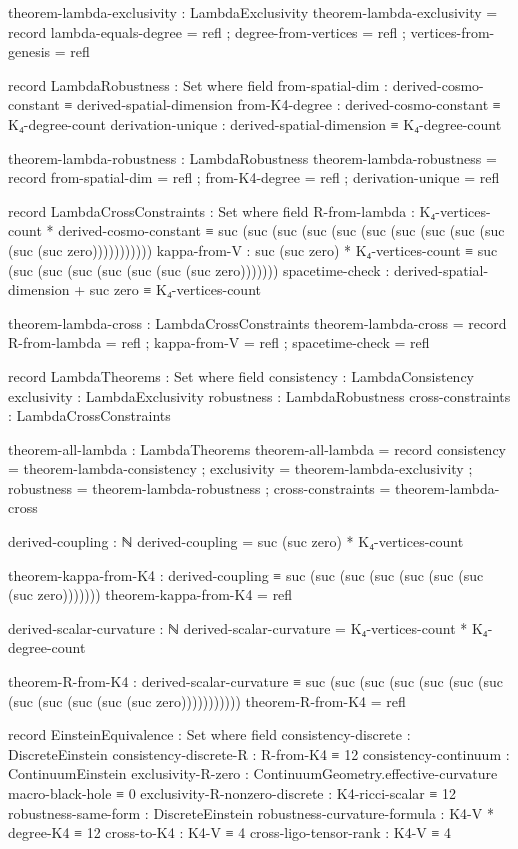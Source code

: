 \documentclass[11pt,a4paper]{book}
\begin{document}
\begin{code}
theorem-lambda-exclusivity : LambdaExclusivity
theorem-lambda-exclusivity = record
  { lambda-equals-degree = refl
  ; degree-from-vertices = refl
  ; vertices-from-genesis = refl
  }

record LambdaRobustness : Set where
  field
    from-spatial-dim   : derived-cosmo-constant ≡ derived-spatial-dimension
    from-K4-degree     : derived-cosmo-constant ≡ K₄-degree-count
    derivation-unique  : derived-spatial-dimension ≡ K₄-degree-count

theorem-lambda-robustness : LambdaRobustness
theorem-lambda-robustness = record
  { from-spatial-dim  = refl
  ; from-K4-degree    = refl
  ; derivation-unique = refl
  }

record LambdaCrossConstraints : Set where
  field
    R-from-lambda      : K₄-vertices-count * derived-cosmo-constant ≡ suc (suc (suc (suc (suc (suc (suc (suc (suc (suc (suc (suc zero)))))))))))
    kappa-from-V       : suc (suc zero) * K₄-vertices-count ≡ suc (suc (suc (suc (suc (suc (suc (suc zero)))))))
    spacetime-check    : derived-spatial-dimension + suc zero ≡ K₄-vertices-count

theorem-lambda-cross : LambdaCrossConstraints
theorem-lambda-cross = record
  { R-from-lambda      = refl
  ; kappa-from-V       = refl
  ; spacetime-check    = refl
  }

record LambdaTheorems : Set where
  field
    consistency       : LambdaConsistency
    exclusivity       : LambdaExclusivity
    robustness        : LambdaRobustness
    cross-constraints : LambdaCrossConstraints

theorem-all-lambda : LambdaTheorems
theorem-all-lambda = record
  { consistency       = theorem-lambda-consistency
  ; exclusivity       = theorem-lambda-exclusivity
  ; robustness        = theorem-lambda-robustness
  ; cross-constraints = theorem-lambda-cross
  }

derived-coupling : ℕ
derived-coupling = suc (suc zero) * K₄-vertices-count

theorem-kappa-from-K4 : derived-coupling ≡ suc (suc (suc (suc (suc (suc (suc (suc zero)))))))
theorem-kappa-from-K4 = refl

derived-scalar-curvature : ℕ
derived-scalar-curvature = K₄-vertices-count * K₄-degree-count

theorem-R-from-K4 : derived-scalar-curvature ≡ suc (suc (suc (suc (suc (suc (suc (suc (suc (suc (suc (suc zero)))))))))))
theorem-R-from-K4 = refl


record EinsteinEquivalence : Set where
  field
    consistency-discrete : DiscreteEinstein
    consistency-discrete-R : R-from-K4 ≡ 12
    consistency-continuum : ContinuumEinstein
    exclusivity-R-zero : ContinuumGeometry.effective-curvature macro-black-hole ≡ 0
    exclusivity-R-nonzero-discrete : K4-ricci-scalar ≡ 12
    robustness-same-form : DiscreteEinstein
    robustness-curvature-formula : K4-V * degree-K4 ≡ 12
    cross-to-K4 : K4-V ≡ 4
    cross-ligo-tensor-rank : K4-V ≡ 4


\end{code}
\end{document}

